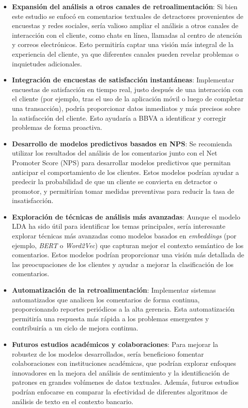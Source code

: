 \documentclass{matematicasud}
\begin{document}
\begin{itemize}

    \item \textbf{Expansión del análisis a otros canales de retroalimentación}: Si bien este estudio se enfocó en comentarios textuales de detractores provenientes de encuestas y redes sociales, sería valioso ampliar el análisis a otros canales de interacción con el cliente, como chats en línea, llamadas al centro de atención y correos electrónicos. Esto permitiría captar una visión más integral de la experiencia del cliente, ya que diferentes canales pueden revelar problemas o inquietudes adicionales.

    \item \textbf{Integración de encuestas de satisfacción instantáneas}: Implementar encuestas de satisfacción en tiempo real, justo después de una interacción con el cliente (por ejemplo, tras el uso de la aplicación móvil o luego de completar una transacción), podría proporcionar datos inmediatos y más precisos sobre la satisfacción del cliente. Esto ayudaría a BBVA a identificar y corregir problemas de forma proactiva.

    \item \textbf{Desarrollo de modelos predictivos basados en NPS}: Se recomienda utilizar los resultados del análisis de los comentarios junto con el Net Promoter Score (NPS) para desarrollar modelos predictivos que permitan anticipar el comportamiento de los clientes. Estos modelos podrían ayudar a predecir la probabilidad de que un cliente se convierta en detractor o promotor, y permitirían tomar medidas preventivas para reducir la tasa de insatisfacción.

    \item \textbf{Exploración de técnicas de análisis más avanzadas}: Aunque el modelo LDA ha sido útil para identificar los temas principales, sería interesante explorar técnicas más avanzadas como modelos basados en \textit{embeddings} (por ejemplo, \textit{BERT} o \textit{Word2Vec}) que capturan mejor el contexto semántico de los comentarios. Estos modelos podrían proporcionar una visión más detallada de las preocupaciones de los clientes y ayudar a mejorar la clasificación de los comentarios.

    \item \textbf{Automatización de la retroalimentación}: Implementar sistemas automatizados que analicen los comentarios de forma continua, proporcionando reportes periódicos a la alta gerencia. Esta automatización permitiría una respuesta más rápida a los problemas emergentes y contribuiría a un ciclo de mejora continua.

    \item \textbf{Futuros estudios académicos y colaboraciones}: Para mejorar la robustez de los modelos desarrollados, sería beneficioso fomentar colaboraciones con instituciones académicas, que podrían explorar enfoques innovadores en la mejora del análisis de sentimiento y la identificación de patrones en grandes volúmenes de datos textuales. Además, futuros estudios podrían enfocarse en comparar la efectividad de diferentes algoritmos de análisis de texto en el contexto bancario.

\end{itemize}
\end{document}
